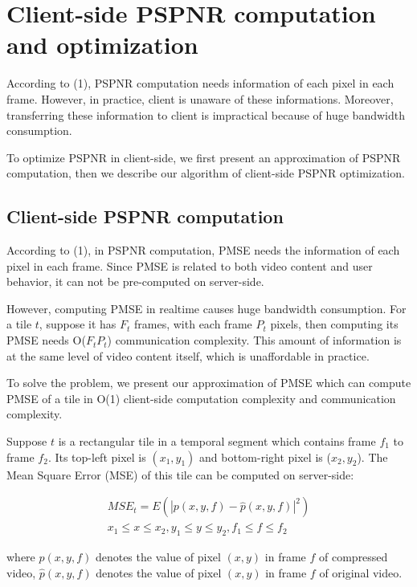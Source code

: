 \section{Client-side PSPNR computation and optimization}

According to (1), PSPNR computation needs information of each pixel in each frame. However, in practice, client is unaware of these informations. Moreover, transferring these information to client is impractical because of huge bandwidth consumption.

To optimize PSPNR in client-side, we first present an approximation of PSPNR computation, then we describe our algorithm of client-side PSPNR optimization.

\subsection{Client-side PSPNR computation}

According to (1), in PSPNR computation, PMSE needs the information of each pixel in each frame. Since PMSE is related to both video content and user behavior, it can not be pre-computed on server-side.

However, computing PMSE in realtime causes huge bandwidth consumption. For a tile $t$, suppose it has $F_t$ frames, with each frame $P_t$ pixels, then computing its PMSE needs O($F_tP_t$) communication complexity. This amount of information is at the same level of video content itself, which is unaffordable in practice.

To solve the problem, we present our approximation of PMSE which can compute PMSE of a tile in O(1) client-side computation complexity and communication complexity.

Suppose $t$ is a rectangular tile in a temporal segment which contains frame $f_1$ to frame $f_2$. Its top-left pixel is $(x_1, y_1)$ and bottom-right pixel is ($x_2, y_2$). The Mean Square Error (MSE) of this tile can be computed on server-side:

\begin{equation}
\begin{aligned}
MSE_t=E(|p(x, y, f) - \hat{p}(x, y, f)|^2)\\
 x_1 \le x \le x_2 , y_1 \le y \le y_2 , f_1 \le f \le f_2
\end{aligned}
\end{equation}

where $p(x, y, f)$ denotes the value of pixel $(x, y)$ in frame $f$ of compressed video, $\hat{p}(x, y, f)$ denotes the value of pixel $(x, y)$ in frame $f$ of original video.

